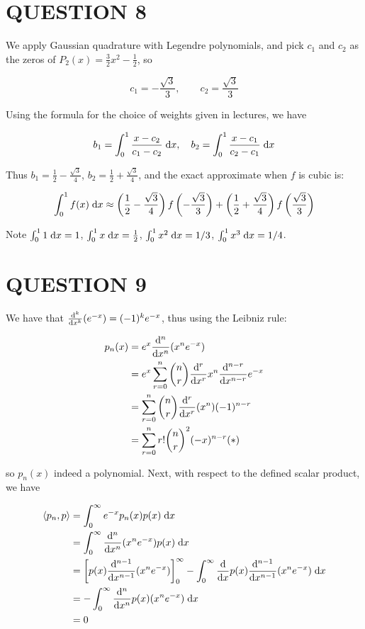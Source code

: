 \documentclass[a4paper]{article}
\begin{document}
\section{QUESTION 8}

We apply Gaussian quadrature with Legendre polynomials, and pick $ c_{1} $ and $ c_{2} $ as the zeros of $ P_{2}(x) = \frac{3}{2} x^{2} - \frac{1}{2} $, so

\[ c_{1} = - \frac{\sqrt{3}}{3}, \qquad c_{2} =  \frac{\sqrt{3}}{3}  \]

Using the formula for the choice of weights given in lectures, we have

\[ b_{1} = \int_{0}^{1} \frac{x - c_{2}}{c_{1} - c_{2}} \; \mathrm{d} x, \quad b_{2} = \int_{0}^{1} \frac{x - c_{1}}{c_{2} - c_{1}} \; \mathrm{d} x \]

Thus $ b_{1} = \frac{1}{2} - \frac{\sqrt{3}}{4} $, $ b_{2} = \frac{1}{2} + \frac{\sqrt{3}}{4} $, and the exact approximate when $ f $ is cubic is: 

\[ \int_{0}^{1} f(x) \; \mathrm{d} x \approx  \left( \frac{1}{2} - \frac{\sqrt{3}}{4} \right) f \left(    -  \frac{\sqrt{3}}{3} \right) + \left( \frac{1}{2} + \frac{\sqrt{3}}{4} \right) f \left(   \frac{\sqrt{3}}{3} \right) \]

Note $ \int_{0}^{1} 1 \; \mathrm{d} x = 1  $, $ \int_{0}^{1} x \; \mathrm{d} x = \frac{1}{2}  $, $ \int_{0}^{1} x^{2} \; \mathrm{d} x = 1 / 3  $, $ \int_{0}^{1} x^{3} \; \mathrm{d} x = 1/4  $. 

 
\section{QUESTION 9}

We have that $ \frac{\mathrm{d}^{k} }{\mathrm{d} x^{k}} (e^{-x}) = (-1)^{k}e^{-x} $, thus using the Leibniz rule:

\begin{align*}
p_{n}(x) & = e^{x} \frac{\mathrm{d}^{n} }{\mathrm{d} x^{n}} (x^{n} e^{-x}) \\
& = e^{x} \sum_{r=0}^{n} \binom{n}{r} \frac{\mathrm{d}^{r} }{\mathrm{d} x^{r}} x^{n}  \frac{\mathrm{d}^{n-r} }{\mathrm{d} x^{n-r}} e^{-x} \\
& =  \sum_{r=0}^{n} \binom{n}{r} \frac{\mathrm{d}^{r} }{\mathrm{d} x^{r}} (x^{n}) (-1)^{n-r} \\
& =  \sum_{r=0}^{n} r! \binom{n}{r}^{2} (-x)^{n-r} (*)
\end{align*}

so $ p_{n}(x) $ indeed a polynomial. Next, with respect to the defined scalar product, we have 

\begin{align*}
\langle p_{n},p \rangle & = \int_{0}^{\infty} e^{-x} p_{n}(x) p(x) \; \mathrm{d} x  \\
& = \int_{0}^{\infty}  \frac{\mathrm{d}^{n} }{\mathrm{d} x^{n}} (x^{n} e^{-x}) p(x) \; \mathrm{d} x  \\
& = \left[  p(x) \frac{\mathrm{d}^{n-1} }{\mathrm{d} x^{n-1}}(x^{n}e^{-x})   \right]_{0}^{\infty} - \int_{0}^{\infty} \frac{\mathrm{d} }{\mathrm{d} x} p(x) \frac{\mathrm{d}^{n-1} }{\mathrm{d} x^{n-1}} (x^{n} e^{-x}) \; \mathrm{d} x \\
& = - \int_{0}^{\infty} \frac{\mathrm{d}^{n} }{\mathrm{d} x^{n}} p(x) (x^{n} e^{-x}) \; \mathrm{d} x \\
& = 0
\end{align*}
\end{document}
